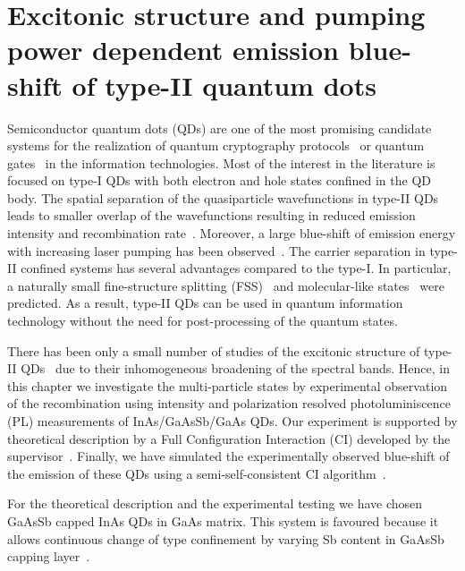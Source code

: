 
\chapter{Excitonic structure and pumping power dependent emission blue-shift of type-II quantum dots}
\label{chap:SciRep}


Semiconductor quantum dots (QDs) are one of the most promising candidate systems for the realization of quantum cryptography protocols~\citep{Muller2014,Strauf2007} or quantum gates~\citep{Stevenson2006,Rodt} in the information technologies. Most of the interest in the literature is focused on type-I QDs with both electron and hole states confined in the QD body. 
The spatial separation of the quasiparticle wavefunctions in type-II QDs leads to smaller overlap of the wavefunctions resulting in reduced emission intensity and recombination rate~\citep{Klenovsky10,KleJOPCS,Hsu,Nishikawa2012}. Moreover, a large blue-shift of emission energy with increasing laser pumping has been observed~\citep{Jin,UlloaHomogSRL}. The carrier separation in type-II confined systems has several advantages compared to the type-I. In particular, a naturally small fine-structure splitting (FSS)~\citep{Krapek2015} and molecular-like states~\citep{Klenovsky10,KleJOPCS,KrapekNottingham} were predicted. As a result, type-II QDs can be used in quantum information technology without the need for post-processing of the quantum states. 

There has been only a small number of studies of the excitonic structure of type-II QDs~\citep{Matsuda2007,Miloszewski2014} due to their inhomogeneous broadening of the spectral bands. Hence, in this chapter we investigate the multi-particle states by experimental observation of the recombination using intensity and polarization resolved photoluminiscence (PL) measurements of InAs/GaAsSb/GaAs QDs. Our experiment is supported by theoretical description by a Full Configuration Interaction (CI) developed by the supervisor~\citep{Klenovsky2017}. Finally, we have simulated the experimentally observed blue-shift of the emission of these QDs using a semi-self-consistent CI algorithm~\citep{Klenovsky2017}.

\medskip
For the theoretical description and the experimental testing we have chosen GaAsSb capped InAs QDs in GaAs matrix. This system is favoured because it allows continuous change of type confinement by varying Sb content in GaAsSb capping layer~\citep{Klenovsky10}.

